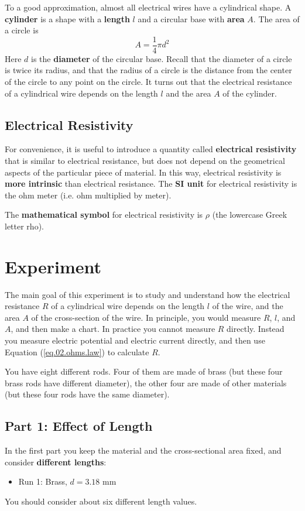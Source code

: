 To a good approximation, almost all electrical wires have a cylindrical shape. A \textbf{cylinder} is a shape with a \textbf{length} $l$ and a circular base with \textbf{area} $A$. The area of a circle is
\begin{equation}
	A = \frac{1}{4} \pi d^{2}
	\label{eq.02.area}
\end{equation}
Here $d$ is the \textbf{diameter} of the circular base. Recall that the diameter of a circle is twice its radius, and that the radius of a circle is the distance from the center of the circle to any point on the circle. It turns out that the electrical resistance of a cylindrical wire depends on the length $l$ and the area $A$ of the cylinder.
%
\subsection{Electrical Resistivity}
%
For convenience, it is useful to introduce a quantity called \textbf{electrical resistivity} that is similar to electrical resistance, but does not depend on the geometrical aspects of the particular piece of material. In this way, electrical resistivity is \textbf{more intrinsic} than electrical resistance. The \textbf{SI unit} for electrical resistivity is the ohm {\textperiodcentered} meter (i.e. ohm multiplied by meter).

The \textbf{mathematical symbol} for electrical resistivity is $\rho$ (the lowercase Greek letter rho).
%
\section{Experiment}
%
The main goal of this experiment is to study and understand how the electrical resistance $R$ of a cylindrical wire depends on the length $l$ of the wire, and the area $A$ of the cross-section of the wire. In principle, you would measure $R$, $l$, and $A$, and then make a chart. In practice you cannot measure $R$ directly. Instead you measure electric potential and electric current directly, and then use Equation (\ref{eq.02.ohms.law}) to calculate $R$.

You have eight different rods. Four of them are made of brass (but these four brass rods have different diameter), the other four are made of other materials (but these four rods have the same diameter).
%
\subsection{Part 1: Effect of Length}
%
In the first part you keep the material and the cross-sectional area fixed, and consider \textbf{different lengths}:
\begin{itemize}
	\item Run 1: Brass, $d = 3.18$ mm
\end{itemize}
You should consider about six different length values.
%
